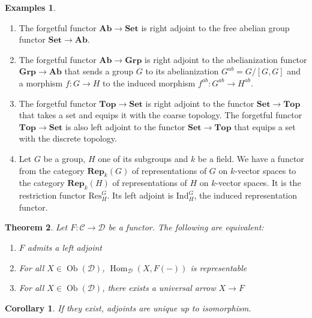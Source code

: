 \documentclass{article}
\newcommand{\cat}{\mathcal{C}}
\newcommand{\catt}{\mathcal{D}}
\newcommand{\Set}{\mathbf{Set}}
\newcommand{\Top}{\mathbf{Top}}
\newcommand{\Grp}{\mathbf{Grp}}
\newcommand{\Ab}{\mathbf{Ab}}
\newcommand{\Rep}{\mathbf{Rep}}
\DeclareMathOperator{\Ob}{Ob}
\DeclareMathOperator{\Hom}{Hom}
\theoremstyle{plain}
\newtheorem{theorem}{Theorem}[section]
\newtheorem*{corollary}{Corollary}
\theoremstyle{definition}
\newtheorem{examples}[theorem]{Examples}
\theoremstyle{remark}
\begin{document}
\begin{examples} \leavevmode
    \begin{enumerate} 
        \item The forgetful functor $\Ab \to \Set$ is right adjoint to the free abelian group functor $\Set \to \Ab$.
        \item The forgetful functor $\Ab \to \Grp$ is right adjoint to the abelianization functor $\Grp \to \Ab$ that sends a group $G$ to its abelianization $G^{ab} = G/[G,G]$ and a morphism $f : G \to H$ to the induced morphism $f^{ab} : G^{ab} \to H^{ab}$.
        \item The forgetful functor $\Top \to \Set$ is right adjoint to the functor $\Set \to \Top$ that takes a set and equips it with the coarse topology. The forgetful functor $\Top \to \Set$ is also left adjoint to the functor $\Set \to \Top$ that equips a set with the discrete topology.
        \item Let $G$ be a group, $H$ one of its subgroups and $k$ be a field. We have a functor from the category $\Rep_k(G)$ of representations of $G$ on $k$-vector spaces to the category $\Rep_k(H)$ of representations of $H$ on $k$-vector spaces. It is the restriction functor $\mathrm{Res}_H^G$. Its left adjoint is $\mathrm{Ind}_H^G$, the induced representation functor.
    \end{enumerate}
\end{examples}

\begin{theorem} \label{thmadjoints}
    Let $F : \cat \to \catt$ be a functor. The following are equivalent:
    \begin{enumerate}
        \item $F$ admits a left adjoint
        \item For all $X \in \Ob(\catt)$, $\Hom_\catt (X,F(-))$ is representable
        \item For all $X \in \Ob(\catt)$, there exists a universal arrow $X \to F$
    \end{enumerate}
\end{theorem}

\begin{corollary}
    If they exist, adjoints are unique up to isomorphism.
\end{corollary}
\end{document}
